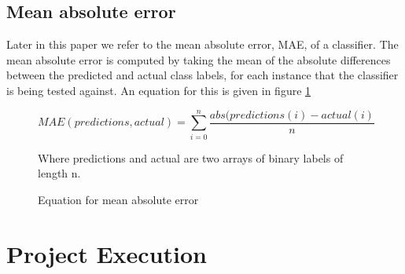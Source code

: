 \documentclass[ %
                    author={Sam Phippen},
                supervisor={Dr. Rafal Bogacz},
                     title={Real time voice activity detectors in noisy personal computing environments},
                  subtitle={},
                    degree={MEng},
                      year={2012} ]{thesis}
\begin{document}
\section{Mean absolute error}

Later in this paper we refer to the mean absolute error, MAE, of a classifier.
The mean absolute error is computed by taking the mean of the absolute
differences between the predicted and actual class labels, for each instance
that the classifier is being tested against. An equation for this is given in
figure \ref{mae-eqn}

\begin{figure}
    \begin{center}
        $$MAE(predictions, actual) = \sum_{i=0}^n\frac{abs(predictions(i)-actual(i)}{n}$$
    \end{center}

    Where predictions and actual are two arrays of binary labels of length n.
    \caption{Equation for mean absolute error}
    \label{mae-eqn}
\end{figure}




\chapter{Project Execution}
\label{chap:execution}

\vspace{1cm} 

%
%
%
\end{document}
